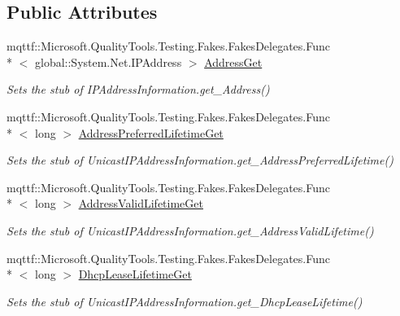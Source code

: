 \subsection*{Public Attributes}
\begin{DoxyCompactItemize}
\item 
mqttf\-::\-Microsoft.\-Quality\-Tools.\-Testing.\-Fakes.\-Fakes\-Delegates.\-Func\\*
$<$ global\-::\-System.\-Net.\-I\-P\-Address $>$ \hyperlink{class_system_1_1_net_1_1_network_information_1_1_fakes_1_1_stub_unicast_i_p_address_information_a1693e378b5cbc6e4eb709bdbed77f224}{Address\-Get}
\begin{DoxyCompactList}\small\item\em Sets the stub of I\-P\-Address\-Information.\-get\-\_\-\-Address()\end{DoxyCompactList}\item 
mqttf\-::\-Microsoft.\-Quality\-Tools.\-Testing.\-Fakes.\-Fakes\-Delegates.\-Func\\*
$<$ long $>$ \hyperlink{class_system_1_1_net_1_1_network_information_1_1_fakes_1_1_stub_unicast_i_p_address_information_a2a6a08e161f9b7509a4146c64fd86972}{Address\-Preferred\-Lifetime\-Get}
\begin{DoxyCompactList}\small\item\em Sets the stub of Unicast\-I\-P\-Address\-Information.\-get\-\_\-\-Address\-Preferred\-Lifetime()\end{DoxyCompactList}\item 
mqttf\-::\-Microsoft.\-Quality\-Tools.\-Testing.\-Fakes.\-Fakes\-Delegates.\-Func\\*
$<$ long $>$ \hyperlink{class_system_1_1_net_1_1_network_information_1_1_fakes_1_1_stub_unicast_i_p_address_information_a878d404c07c3aad4f8779400b3b54c3d}{Address\-Valid\-Lifetime\-Get}
\begin{DoxyCompactList}\small\item\em Sets the stub of Unicast\-I\-P\-Address\-Information.\-get\-\_\-\-Address\-Valid\-Lifetime()\end{DoxyCompactList}\item 
mqttf\-::\-Microsoft.\-Quality\-Tools.\-Testing.\-Fakes.\-Fakes\-Delegates.\-Func\\*
$<$ long $>$ \hyperlink{class_system_1_1_net_1_1_network_information_1_1_fakes_1_1_stub_unicast_i_p_address_information_a6f40c0a896b1f81c21ead1587b63df53}{Dhcp\-Lease\-Lifetime\-Get}
\begin{DoxyCompactList}\small\item\em Sets the stub of Unicast\-I\-P\-Address\-Information.\-get\-\_\-\-Dhcp\-Lease\-Lifetime()\end{DoxyCompactList}\item 

\end{DoxyCompactItemize}
